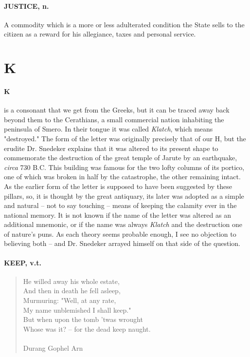 \documentclass[11pt]{article}
\begin{document}
\paragraph{JUSTICE, n.}  A commodity which is a more or less adulterated condition
the State sells to the citizen as a reward for his allegiance, taxes
and personal service.



\section*{K}




\paragraph{K} is a consonant that we get from the Greeks, but it can be traced
away back beyond them to the Cerathians, a small commercial nation
inhabiting the peninsula of Smero.  In their tongue it was called
{\em Klatch}, which means "destroyed."  The form of the letter was
originally precisely that of our H, but the erudite Dr. Snedeker
explains that it was altered to its present shape to commemorate the
destruction of the great temple of Jarute by an earthquake, {\em circa}
730 B.C.  This building was famous for the two lofty columns of its
portico, one of which was broken in half by the catastrophe, the other
remaining intact.  As the earlier form of the letter is supposed to
have been suggested by these pillars, so, it is thought by the great
antiquary, its later was adopted as a simple and natural -- not to say
touching -- means of keeping the calamity ever in the national memory.
It is not known if the name of the letter was altered as an additional
mnemonic, or if the name was always {\em Klatch} and the destruction one
of nature's puns.  As each theory seems probable enough, I see no
objection to believing both -- and Dr. Snedeker arrayed himself on
that side of the question.

\paragraph{KEEP, v.t.}

\begin{quote}   He willed away his whole estate, \\
      And then in death he fell asleep, \\
  Murmuring:  "Well, at any rate, \\
      My name unblemished I shall keep." \\
  But when upon the tomb 'twas wrought \\
  Whose was it? -- for the dead keep naught. \\
 \\
Durang Gophel Arn \end{quote}
\end{document}
